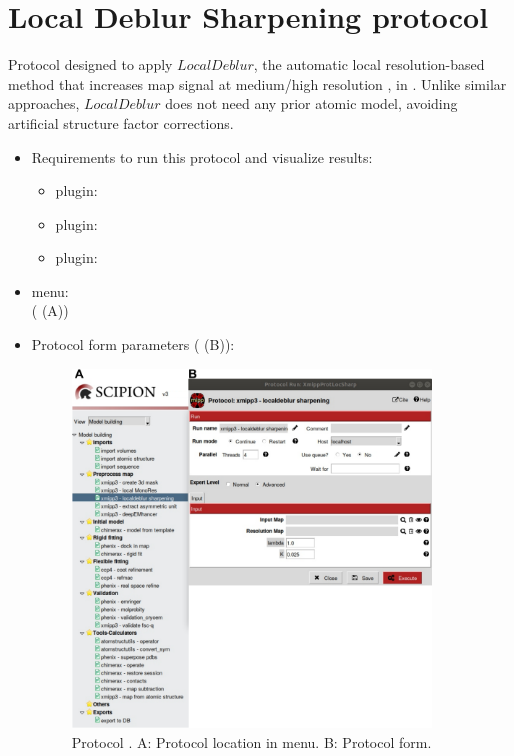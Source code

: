 \section{Local Deblur Sharpening protocol}
\label{app:localDeblurSharpening}%

Protocol designed to apply $LocalDeblur$, the automatic local resolution-based method that increases map signal at medium/high resolution \citep{ramirez2018}, in \scipion. Unlike similar approaches, $LocalDeblur$ does not need any prior atomic model, avoiding artificial structure factor corrections.

\begin{itemize}
 \item Requirements to run this protocol and visualize results:
    \begin{itemize}
        \item \scipion plugin: 
        \item \scipion plugin: 
        \item \scipion plugin: 
    \end{itemize}
 \item \scipion menu:\\
   ( (A))
  
 \item Protocol form parameters ( (B)):
  
    \begin{figure}[H]
     \centering 
     \captionsetup{width=.7\linewidth} 
     \includegraphics[width=0.90\textwidth]{Images_appendix/Fig208}
     \caption{Protocol . A: Protocol location in \scipion menu. B: Protocol form.}
     \label{fig:app_localdeblur_1}
    \end{figure}
    

\end{itemize}
